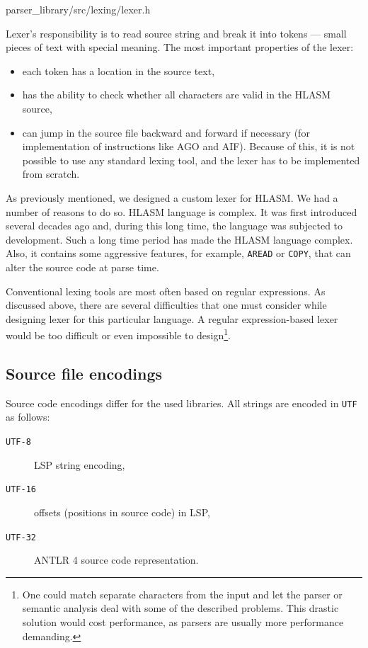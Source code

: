 {parser\_library/src/lexing/lexer.h}

Lexer's responsibility is to read source string and break it into tokens --- small pieces of text with special meaning. The most important properties of the lexer:
\begin{itemize}
	\item each token has a location in the source text,
	\item has the ability to check whether all characters are valid in the HLASM source,
	\item can jump in the source file backward and forward if necessary (for implementation of instructions like AGO and AIF). Because of this, it is not possible to use any standard lexing tool, and the lexer has to be implemented from scratch.
\end{itemize}

As previously mentioned, we designed a custom lexer for HLASM. We had a number of reasons to do so. HLASM language is complex. It was first introduced several decades ago and, during this long time, the language was subjected to development. Such a long time period has made the HLASM language complex. Also, it contains some aggressive features, for example, \texttt{AREAD} or \texttt{COPY}, that can alter the source code at parse time.

Conventional lexing tools are most often based on regular expressions. As discussed above, there are several difficulties that one must consider while designing lexer for this particular language. A regular expression-based lexer would be too difficult or even impossible to design\footnote{One could match separate characters from the input and let the parser or semantic analysis deal with some of the described problems. This drastic solution would cost performance, as parsers are usually more performance demanding.}.

\subsection{Source file encodings}
Source code encodings differ for the used libraries. All strings are encoded in \texttt{UTF} as follows:

\begin{description}
	\item[\texttt{UTF-8}] LSP string encoding,
	\item[\texttt{UTF-16}] offsets (positions in source code) in LSP,
	\item[\texttt{UTF-32}] ANTLR 4 source code representation.
\end{description}

